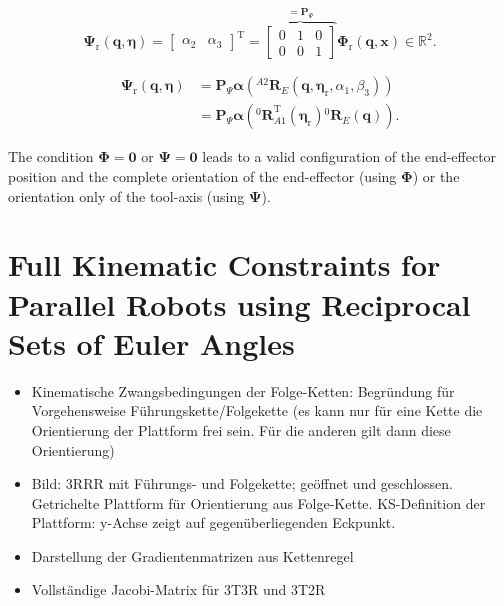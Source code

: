 \documentclass[robotics,article,submit,moreauthors,pdftex]{Definitions/mdpi}
\newcommand{\bm}[1]{\boldsymbol{#1}}
\newcommand{\rotmat}[2]{{{ }^{#1}\boldsymbol{R}}_{#2}}
\newcommand{\transp}[0]{{\mathrm{T}}}
\begin{document}
\begin{equation}
\bm{\Psi}_{\mathrm{r}}(\bm{q},\bm{\eta}) = 
\begin{bmatrix}
\alpha_2  & \alpha_3
\end{bmatrix}^\transp
=
\overbrace{\begin{bmatrix}
    0 & 1 & 0  \\ 
    0 & 0 & 1
    \end{bmatrix}}^{=\bm{P}_{\Psi}}
\bm{\Phi}_{\mathrm{r}} (\bm{q},\bm{x})
\in {\mathbb{R}}^{2}.
\label{equ:Psir_def}
\end{equation}


\begin{align}
\bm{\Psi}_{\mathrm{r}}(\bm{q},\bm{\eta})
&=
\bm{P}_{\Psi} \bm{\alpha}\left(\rotmat{A2}{E}(\bm{q},\bm{\eta}_{\mathrm{r}},\alpha_1,\beta_3)\right) \nonumber\\
&=
\bm{P}_{\Psi} \bm{\alpha}\left(\rotmat{0}{A1}^\transp (\bm{\eta}_{\mathrm{r}})\rotmat{0}{E}(\bm{q})\right).
\end{align}


The condition $\bm{\Phi}=\bm{0}$ or $\bm{\Psi}=\bm{0}$ leads to a valid configuration of the end-effector position and the complete orientation of the end-effector (using $\bm{\Phi}$) or the orientation only of the tool-axis (using $\bm{\Psi}$).





\section{Full Kinematic Constraints for Parallel Robots using Reciprocal Sets of Euler Angles}
\label{sec:ZB_PKM}

\begin{itemize}
    \item Kinematische Zwangsbedingungen der Folge-Ketten: Begründung für Vorgehensweise Führungskette/Folgekette (es kann nur für eine Kette die Orientierung der Plattform frei sein. Für die anderen gilt dann diese Orientierung)
    \item Bild: 3RRR mit Führungs- und Folgekette; geöffnet und geschlossen. Getrichelte Plattform für Orientierung aus Folge-Kette. KS-Definition der Plattform: y-Achse zeigt auf gegenüberliegenden Eckpunkt.
    \item Darstellung der Gradientenmatrizen aus Kettenregel
    \item Vollständige Jacobi-Matrix für 3T3R und 3T2R
\end{itemize}
\end{document}

